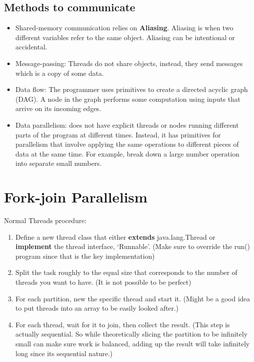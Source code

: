 \documentclass[letterpaper,12pt]{article}
\begin{document}
\subsection{Methods to communicate}
\begin{itemize}
      \item Shared-memory communication relies on \textbf{Aliasing}. Aliasing is when two different variables refer to the same object. Aliasing can be intentional or accidental.
      \item Message-passing: Threads do not share objects, instead, they send messages which is a copy of some data.
      \item Data flow: The programmer uses primitives to create a directed acyclic graph (DAG). A node in the graph performs some computation using inputs that arrive on its incoming edges.
      \item Data parallelism: does not have explicit threads or nodes running different parts of the program at different times. Instead, it has primitives for parallelism that involve applying the same operations to different pieces of data at the same time. For example, break down a large number operation into separate small numbers.
\end{itemize}

\section{Fork-join Parallelism}
Normal Threads procedure:
\begin{enumerate}
      \item Define a new thread class that either \textbf{extends} java.lang.Thread or \textbf{implement} the thread interface, `Runnable'. (Make sure to override the run() program since that is the key implementation)
      \item Split the task roughly to the equal size that corresponds to the number of threads you want to have. (It is not possible to be perfect)

      \item For each partition, new the specific thread and start it. (Might be a good idea to put threads into an array to be easily looked after.)
      \item For each thread, wait for it to join, then collect the result. (This step is actually sequential. So while theoretically slicing the partition to be infinitely small can make sure work is balanced, adding up the result will take infinitely long since its sequential nature.)
\end{enumerate}
\end{document}
